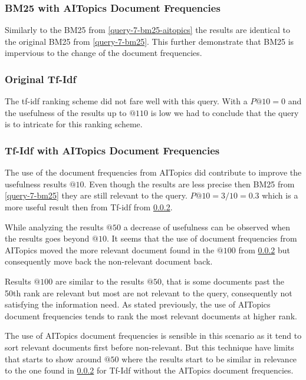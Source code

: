 \subsubsection{BM25 with AITopics Document Frequencies}\label{query-8-bm25-aitopics}

\par Similarly to the BM25 from \ref{query-7-bm25-aitopics} the results are identical to the original BM25 from \ref{query-7-bm25}. This further demonstrate that BM25 is impervious to the change of the document frequencies.

\subsubsection{Original Tf-Idf}\label{query-8-tf-idf}

\par The tf-idf ranking scheme did not fare well with this query. With a $P@10=0$ and the usefulness of the results up to $@110$ is low we had to conclude that the query is to intricate for this ranking scheme.

\subsubsection{Tf-Idf with AITopics Document Frequencies} \label{query-8-tf-idf-aitopics}

\par The use of the document frequencies from AITopics did contribute to improve the usefulness results $@10$. Even though the results are less precise then BM25 from \ref{query-7-bm25} they are still relevant to the query. $P@10=3/10=0.3$ which is a more useful result then from Tf-idf from \ref{query-8-tf-idf}.
\par While analyzing the results $@50$ a decrease of usefulness can be observed when the results goes beyond $@10$. It seems that the use of document frequencies from AITopics moved the more relevant document found in the $@100$ from \ref{query-8-tf-idf} but consequently move back the non-relevant document back.
\par Results $@100$ are similar to the results $@50$, that is some documents past the 50th rank are relevant but most are not relevant to the query, consequently not satisfying the information need. As stated previously, the use of AITopics document frequencies tends to rank the most relevant documents at higher rank.
\par The use of AITopics document frequencies is sensible in this scenario as it tend to sort relevant documents first before non-relevant. But this technique have limits that starts to show around $@50$ where the results start to be similar in relevance to the one found in \ref{query-8-tf-idf} for Tf-Idf without the AITopics document frequencies.

